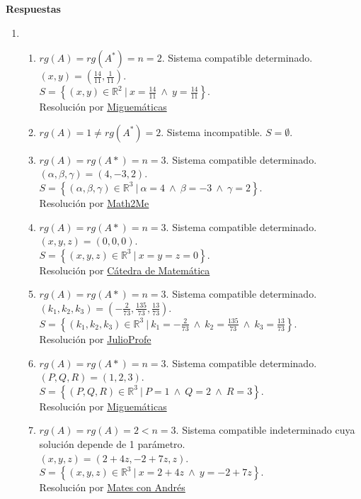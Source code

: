 \documentclass[a4paper]{article}
\newcommand{\exercise}{\item}
\begin{document}
\vspace{20pt} 
 \textbf{Respuestas}\begin{enumerate}\exercise\begin{enumerate} [label=(\alph*)]		\item $rg(A)=rg(A^*)=n=2$. Sistema compatible determinado. \\ $(x,y)=\left(\frac{14}{11},\frac{1}{11}\right)$. \\ $S=\left\{(x,y)\in \mathbb{R}^2 ~|~ x=\frac{14}{11} ~\land~ y=\frac{14}{11}\right\}$. \\ Resolución por \href{https://youtu.be/OE8e70VO_CE}{Miguemáticas}
		\item $rg(A) = 1 \neq rg(A^*) =2$. Sistema incompatible. $S=\emptyset$. 
		\item $rg(A)=rg(A*)=n=3$. Sistema compatible determinado. \\ $(\alpha,\beta,\gamma)=(4,-3,2)$. \\ $S=\left\{(\alpha,\beta,\gamma)\in \mathbb{R}^3 ~|~ \alpha=4 ~\land~ \beta=-3 ~\land~ \gamma=2 \right\}$. \\ Resolución por \href{https://youtu.be/ZtMdsFXiFYQ}{Math2Me}
		\item $rg(A)=rg(A*)=n=3$. Sistema compatible determinado. \\ $(x,y,z)=(0,0,0)$. \\ $S=\left\{(x,y,z)\in \mathbb{R}^3 ~|~ x=y=z=0 \right\}$. \\ Resolución por \href{https://youtu.be/5tOyCI7YIwk?t=21}{Cátedra de Matemática}
		\item $rg(A)=rg(A*)=n=3$. Sistema compatible determinado. \\ $(k_1,k_2,k_3)=\left(-\frac{2}{73},\frac{135}{73},\frac{13}{73}\right)$. \\ $S=\left\{(k_1,k_2,k_3)\in \mathbb{R}^3 ~|~ k_1=-\frac{2}{73} ~\land~ k_2=\frac{135}{73} ~\land~ k_3=\frac{13}{73} \right\}$. \\ Resolución por \href{https://youtu.be/SxT5Sbn8odE}{JulioProfe}
		\item  $rg(A)=rg(A*)=n=3$. Sistema compatible determinado. \\ $(P,Q,R)=(1,2,3)$. \\ $S=\left\{(P,Q,R)\in \mathbb{R}^3 ~|~ P=1 ~\land~ Q=2 ~\land~ R=3 \right\}$. \\ Resolución por \href{https://youtu.be/kpRQ_jWHSqg?t=95}{Miguemáticas}
		\item  $rg(A)=rg(A)=2<n=3$. Sistema compatible indeterminado cuya solución depende de 1 parámetro. \\ $(x,y,z)=(2+4z,-2+7z,z)$. \\ $S=\left\{(x,y,z)\in \mathbb{R}^3 ~|~ x=2+4z ~\land~ y=-2+7z \right\}$. \\ Resolución por \href{https://youtu.be/ERUAPI-jrH0}{Mates con Andrés}

\end{enumerate}
\end{enumerate}
\end{document}
